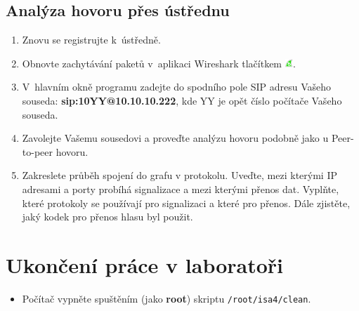 \subsection{Analýza hovoru přes ústřednu}
\begin{enumerate}
    \item Znovu se registrujte k ústředně.
    \item Obnovte zachytávání paketů v aplikaci Wireshark tlačítkem  \includegraphics[width=3mm]{img/ws_start.png}.
    \item V hlavním okně programu zadejte do spodního pole SIP adresu Vašeho souseda: {\bf sip:10YY@10.10.10.222}, kde YY je opět číslo počítače Vašeho souseda.
    \item Zavolejte Vašemu sousedovi a proveďte analýzu hovoru podobně jako u Peer-to-peer hovoru.
    \item Zakreslete průběh spojení do grafu v protokolu. Uveďte, mezi kterými IP adresami a porty probíhá signalizace a mezi kterými přenos dat. Vyplňte, které protokoly se používají pro signalizaci a které pro přenos. Dále zjistěte, jaký kodek pro přenos hlasu byl použit.
\end{enumerate}

\section{Ukončení práce v laboratoři}
\begin{itemize}
  \item Počítač vypněte spuštěním (jako {\bf root}) skriptu {\tt /root/isa4/clean}.
\end{itemize}
